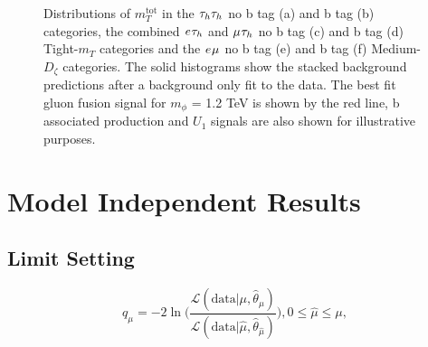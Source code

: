 \begin{figure}[!hbtp]
\caption{Distributions of $m_{T}^\text{tot}$ in the $\tau_{h}\tau_{h}$ no b tag (a) and b tag (b) categories, the combined $e_{}\tau_{h}$ and $\mu_{}\tau_{h}$ no b tag (c) and b tag (d) Tight-$m_{T}$ categories and the $e_{}\mu_{}$ no b tag (e) and b tag (f) Medium-$D_{\zeta}$ categories. The solid histograms show the stacked background predictions after a background only fit to the data. The best fit gluon fusion signal for $m_{\phi}$ = 1.2 TeV is shown by the red line, b associated production and $U_{1}$ signals are also shown for illustrative purposes.}
\label{fig:high_mass_postfit}
\end{figure}

\newpage
\section{Model Independent Results}

\subsection{Limit Setting}

\begin{equation}
  q_{\mu} = -2 \ln \Biggl(\frac{\mathcal{L}(\text{data} | \mu, \hat{\theta}_{\mu})}{\mathcal{L}(\text{data} | \hat{\mu}, \hat{\theta}_{\hat{\mu}})}\Biggl), 0 \leq \hat{\mu} \leq \mu,
\end{equation}

